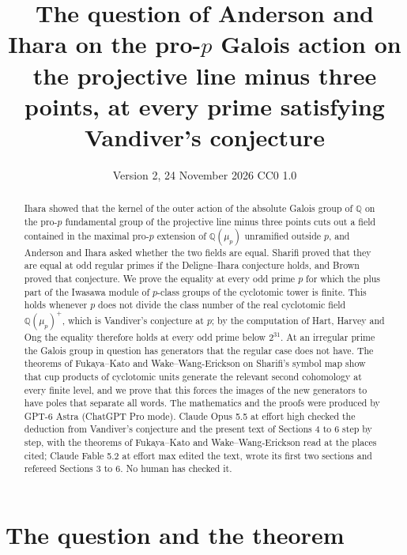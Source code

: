 \documentclass[11pt]{article}
\title{The question of Anderson and Ihara on the pro-$p$ Galois action on the projective line minus three
points, at every prime satisfying Vandiver's conjecture}
\author{}
\date{Version 2, 24 November 2026 \quad CC0 1.0}
\theoremstyle{definition}
\numberwithin{equation}{section}
\begin{document}
\maketitle
\begin{abstract}
\noindent
Ihara showed that the kernel of the outer action of the absolute Galois group of $\mathbb Q$ on the pro-$p$
fundamental group of the projective line minus three points cuts out a field contained in the maximal pro-$p$
extension of $\mathbb Q(\mu_p)$ unramified outside $p$, and Anderson and Ihara asked whether the two fields are
equal. Sharifi proved that they are equal at odd regular primes if the Deligne--Ihara conjecture holds, and Brown
proved that conjecture. We prove the equality at every odd prime $p$ for which the plus part of the Iwasawa module
of $p$-class groups of the cyclotomic tower is finite. This holds whenever $p$ does not divide the class number of
the real cyclotomic field $\mathbb Q(\mu_p)^+$, which is Vandiver's conjecture at $p$; by the computation of Hart,
Harvey and Ong the equality therefore holds at every odd prime below $2^{31}$. At an irregular prime the Galois
group in question has generators that the regular case does not have. The theorems of Fukaya--Kato and
Wake--Wang-Erickson on Sharifi's symbol map show that cup products of cyclotomic units generate the relevant
second cohomology at every finite level, and we prove that this forces the images of the new generators to have
poles that separate all words. The mathematics and the proofs were produced by GPT-6 Astra (ChatGPT Pro mode).
Claude Opus 5.5 at effort high checked the deduction from Vandiver's conjecture and the present text of Sections 4
to 6 step by step, with the theorems of Fukaya--Kato and Wake--Wang-Erickson read at the places cited; Claude Fable
5.2 at effort max edited the text, wrote its first two sections and refereed Sections 3 to 6. No human has
checked it.
\end{abstract}

\section{The question and the theorem}
\end{document}
